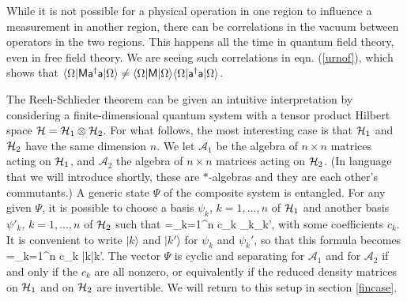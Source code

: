 \documentclass[12pt]{article}
\def\a{{\sf a}}
\numberwithin{equation}{section}
\def\A{{\mathcal A}}
\begin{document}
While it is not possible for a physical operation in one region to influence a measurement in another region, there can be correlations in the vacuum
 between operators in the two regions.  This happens all the time in quantum field theory, even in free field
theory.  We are seeing such correlations in eqn. (\ref{urnof}), which shows that $\langle \Omega|\MM \a^\dagger \a|\Omega\rangle
\not= \langle \Omega|\MM |\Omega\rangle \langle \Omega|\a^\dagger \a|\Omega\rangle$.

The Reeh-Schlieder theorem can be given an intuitive interpretation by considering a finite-dimensional quantum system with a tensor
product Hilbert space ${\mathcal H}={\mathcal H}_1\otimes {\mathcal H}_2$.   For what follows, the most interesting case is that ${\mathcal H}_1$ 
and ${\mathcal H}_2$ have the same dimension
$n$.  We let $\A_1$ be the algebra of $n\times n$ matrices acting on ${\mathcal H}_1$, and $\A_2$ the algebra of $n\times n$ 
matrices acting on ${\mathcal H}_2$. (In language that we will introduce shortly, these are $*$-algebras and they are each other's commutants.)
 A generic state $\Psi$ of the composite system is entangled.  For any given $\Psi$, it is possible to
choose a basis $\psi_k$, $k=1,\dots,n$ of ${\mathcal H}_1$ and another basis $\psi'_k$, $k=1,\dots,n$ of ${\mathcal H}_2$ such that
\be\label{morx} \Psi =\sum_{k=1}^n c_k \psi_k\otimes \psi_k', \ee
with some coefficients $c_k$.
It is convenient to write $|k\rangle$ and $|k'\rangle$ for $\psi_k$ and $\psi_k'$, so that this formula becomes
\be\label{orx}\Psi=\sum_{k=1}^n c_k |k\rangle \otimes |k\rangle'. \ee
The vector $\Psi$ is cyclic and separating for $\A_1$ and for $\A_2$ if and only if the $c_k$ are all nonzero,
or equivalently if the reduced density matrices on ${\mathcal H}_1$ and on ${\mathcal H}_2$ are invertible.  We will return to this setup in section \ref{fincase}.
\end{document}

